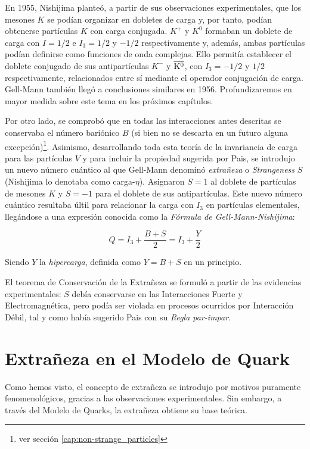 En 1955, Nishijima planteó, a partir de sus observaciones experimentales, que los mesones $K$ se podían organizar en dobletes de carga y, por tanto, podían obtenerse partículas $K$ con carga conjugada. $K^+$ y $K^0$ formaban un doblete de carga con $I=1/2$ e $I_3=1/2$ y $-1/2$ respectivamente y, además, ambas partículas podían definirse como funciones de onda complejas. Ello permitía establecer el doblete conjugado de sus antipartículas $K^-$ y $\overline{\rm K^0}$, con $I_3=-1/2$ y $1/2$ respectivamente, relacionados entre sí mediante el operador conjugación de carga. Gell-Mann también llegó a conclusiones similares en 1956. Profundizaremos en mayor medida sobre este tema en los próximos capítulos. \cite{Nishijima1955}

Por otro lado, se comprobó que en todas las interacciones antes descritas se conservaba el número bariónico $B$ (si bien no se descarta en un futuro alguna excepción)\footnote{ver sección \ref{cap:non-strange_particles}}. Asimismo, desarrollando toda esta teoría de la invariancia de carga para las partículas $V$ y para incluir la propiedad sugerida por Pais, se introdujo un nuevo número cuántico al que Gell-Mann denominó \textit{extrañeza} o \textit{Strangeness} $S$ (Nishijima lo denotaba como carga-$\eta$). Asignaron $S=1$ al doblete de partículas de mesones $K$ y $S=-1$ para el doblete de sus antipartículas. Este nuevo número cuántico resultaba últil para relacionar la carga con $I_3$ en partículas elementales, llegándose a una expresión conocida como la \textit{Fórmula de Gell-Mann-Nishijima}:

\begin{equation}
Q=I_3+ \frac{B+S}{2}=I_3+\frac{Y}{2}
\end{equation}

Siendo $Y$ la \textit{hipercarga}, definida como $Y=B+S$ en un principio.

El teorema de Conservación de la Extrañeza se formuló a partir de las evidencias experimentales: $S$ debía conservarse en las Interacciones Fuerte y Electromagnética, pero podía ser violada en procesos ocurridos por Interacción Débil, tal y como había sugerido Pais con su \textit{Regla par-impar}.


\section{Extrañeza en el Modelo de Quark}\label{cap:strangeness_quark_model}
\vspace{5mm}
Como hemos visto, el concepto de extrañeza se introdujo por motivos puramente fenomenológicos, gracias a las observaciones experimentales. Sin embargo, a través del Modelo de Quarks, la extrañeza obtiene su base teórica.

